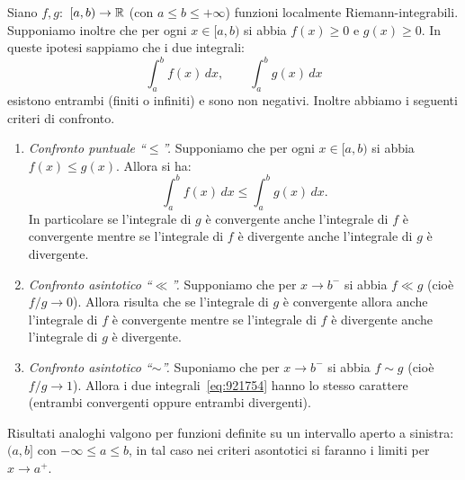 \begin{theorem}
\mymark{**}
Siano $f, g \colon$ $ [a,b)\to \mathbb R$ (con $a \le b \le +\infty$)
funzioni localmente Riemann-integrabili. Supponiamo inoltre che
per ogni $x\in [a,b)$ si abbia $f(x)\ge 0$ e $g(x)\ge 0$.
In queste ipotesi sappiamo che i due integrali:
\begin{equation}\label{eq:921754}
  \int_a^b f(x)\, dx, \qquad \int_a^b g(x)\, dx
\end{equation}
esistono entrambi (finiti o infiniti) e sono non negativi.
Inoltre abbiamo i seguenti criteri di confronto.

\begin{enumerate}
\item \emph{Confronto puntuale ``$\le$''.}
Supponiamo che per ogni $x\in [a,b)$ si abbia $f(x) \le g(x)$. Allora
si ha:
\begin{equation}\label{eq:467143}
  \int_a^b f(x)\, dx \le \int_a^b g(x)\, dx.
\end{equation}
In particolare se l'integrale di $g$ è convergente anche l'integrale di
$f$ è convergente mentre se l'integrale di $f$ è divergente anche l'integrale
di $g$ è divergente.

\item \emph{Confronto asintotico ``$\ll$''.}
Supponiamo che per $x\to b^-$ si abbia $f \ll g$ (cioè $f/g\to 0$).
Allora risulta che
se l'integrale di $g$ è convergente allora anche l'integrale di $f$ è convergente
mentre se l'integrale di $f$ è divergente anche l'integrale di $g$ è divergente.

\item \emph{Confronto asintotico ``$\sim$''.}
Suponiamo che per $x\to b^-$ si abbia $f\sim g$ (cioè $f/g\to 1$).
Allora i due integrali~\eqref{eq:921754}
hanno lo stesso carattere (entrambi convergenti oppure entrambi divergenti).
\end{enumerate}

Risultati analoghi valgono per funzioni definite su un intervallo aperto a
sinistra: $(a, b]$ con $-\infty \le a \le b$,
in tal caso nei criteri asontotici si faranno i limiti per $x\to a^+$.
\end{theorem}
%
